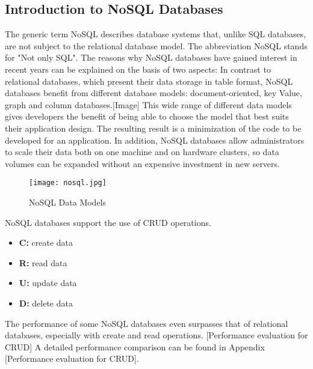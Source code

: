 \subsection{Introduction to NoSQL Databases}
The generic term NoSQL describes database systems that, unlike SQL databases, are not subject to the relational database model. The abbreviation NoSQL stands for "Not only SQL". The reasons why NoSQL databases have gained interest in recent years can be explained on the basis of two aspects: In contrast to relational databases, which present their data storage in table format, NoSQL databases benefit from different database models: document-oriented, key Value, graph and column databases.[Image] This wide range of different data models gives developers the benefit of being able to choose the model that best suits their application design. The resulting result is a minimization of the code to be developed for an application. In addition, NoSQL databases allow administrators to scale their data both on one machine and on hardware clusters, so data volumes can be expanded without an expensive investment in new servers.
\begin{figure}[H]
	\centering
	\texttt{[image: nosql.jpg]}
	\caption[NoSQL Data Models]{NoSQL Data Models}
\end{figure}

NoSQL databases support the use of CRUD operations.
\begin{itemize}
	\item \textbf{C:} create data
	\item \textbf{R:} read data
	\item \textbf{U:} update data
	\item \textbf{D:} delete data
\end{itemize}
The performance of some NoSQL databases even surpasses that of relational databases, especially with create and read operations. [Performance evaluation for CRUD] A detailed  performance comparison can be found in Appendix [Performance evaluation for CRUD].
